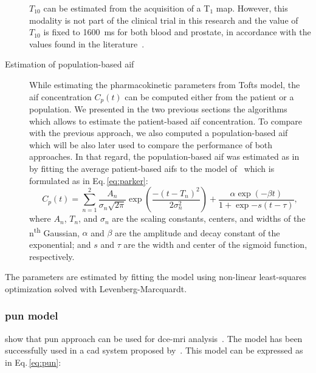 \begin{description}
      $T_{10}$ can be estimated from the acquisition of a T$_1$ map.
      However, this modality is not part of the clinical trial in this research and the value of $T_{10}$ is fixed to \SI{1600}{\ms} for both blood and prostate, in accordance with the values found in the literature~\citep{fennessy2015quantitative,de2004mr,carr2011magnetic}.
      \item[Estimation of population-based \ac{aif}] While estimating the pharmacokinetic parameters from Tofts model, the \ac{aif} concentration $C_p(t)$ can be computed either from the patient or a population.
        We presented in the two previous sections the algorithms which allows to estimate the patient-based \ac{aif} concentration.
        To compare with the previous approach, we also computed a population-based \ac{aif} which will be also later used to compare the performance of both approaches.
        In that regard, the population-based \ac{aif} was estimated as in~\citep{meng2010comparison} by fitting the average patient-based \ac{aif}s to the model of~\cite{parker2006experimentally} which is formulated as in Eq.\,\eqref{eq:parker}:
        \begin{equation}
          C_p(t) = \sum_{n=1}^{2} \frac{A_n}{\sigma_n \sqrt{2 \pi}} \exp\left(\frac{- (t- T_n)^2}{2\sigma_{n}^{2}}\right) + \frac{\alpha \exp(-\beta t)}{1 + \exp{-s (t - \tau)}} ,
          \label{eq:parker}
        \end{equation}
        \noindent where $A_n$, $T_n$, and $\sigma_n$ are the scaling constants, centers, and widths of the n\textsuperscript{th} Gaussian, $\alpha$ and $\beta$ are the amplitude and decay constant of the exponential; and $s$ and $\tau$ are the width and center of the sigmoid function, respectively.
\end{description}

The parameters are estimated by fitting the model using non-linear least-squares optimization solved with Levenberg-Marcquardt.

\subsubsection{\acs*{pun} model}\label{sec:pun}

\citeauthor{gliozzi2011phenomenological} show that \ac{pun} approach can be used for \ac{dce}-\ac{mri} analysis~\citep{gliozzi2011phenomenological}.
The model has been successfully used in a \ac{cad} system proposed by~\cite{giannini2015fully}.
This model can be expressed as in Eq.\,\eqref{eq:pun}:

